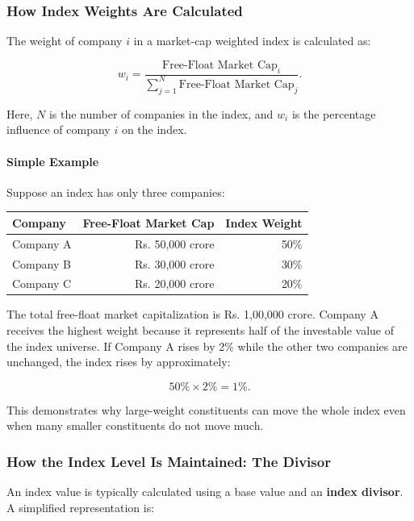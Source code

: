 \documentclass[12pt,openany]{book}
\begin{document}
\subsubsection{How Index Weights Are Calculated}
The weight of company $i$ in a market-cap weighted index is calculated as:

\begin{equation*}
    w_i = \frac{\text{Free-Float Market Cap}_i}{\sum_{j=1}^{N} \text{Free-Float Market Cap}_j}.
\end{equation*}

Here, $N$ is the number of companies in the index, and $w_i$ is the percentage influence of company $i$ on the index.

\paragraph{Simple Example}
Suppose an index has only three companies:

\begin{center}
\begin{tabular}{|l|r|r|}
\hline
\textbf{Company} & \textbf{Free-Float Market Cap} & \textbf{Index Weight} \\
\hline
Company A & Rs. 50,000 crore & 50\% \\
\hline
Company B & Rs. 30,000 crore & 30\% \\
\hline
Company C & Rs. 20,000 crore & 20\% \\
\hline
\end{tabular}
\end{center}

The total free-float market capitalization is Rs. 1,00,000 crore. Company A receives the highest weight because it represents half of the investable value of the index universe. If Company A rises by 2\% while the other two companies are unchanged, the index rises by approximately:

\begin{equation*}
    50\% \times 2\% = 1\%.
\end{equation*}

This demonstrates why large-weight constituents can move the whole index even when many smaller constituents do not move much.

\subsubsection{How the Index Level Is Maintained: The Divisor}
An index value is typically calculated using a base value and an \textbf{index divisor}. A simplified representation is:
\end{document}
